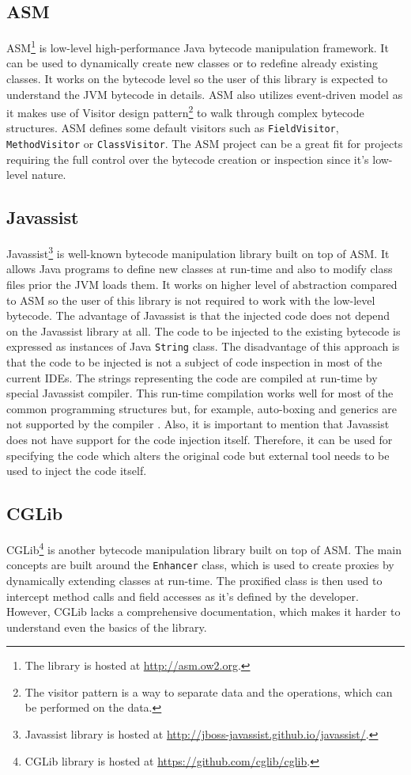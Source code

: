 \subsection{ASM}
\label{asm}
ASM\footnote{The library is hosted at \url{http://asm.ow2.org}.} is low-level high-performance Java bytecode manipulation framework. It can be used to dynamically create new classes or to redefine already existing classes. It works on the bytecode level so the user of this library is expected to understand the JVM bytecode in details. ASM also utilizes event-driven model as it makes use of Visitor design pattern\footnote{The visitor pattern is a way to separate data and the operations, which can be performed on the data.} to walk through complex bytecode structures. ASM defines some default visitors such as \texttt{FieldVisitor}, \texttt{MethodVisitor} or \texttt{ClassVisitor}. The ASM project can be a great fit for projects requiring the full control over the bytecode creation or inspection since it's low-level nature.
\subsection{Javassist}
\label{javassist}
Javassist\footnote{Javassist library is hosted at \url{http://jboss-javassist.github.io/javassist/}.} is well-known bytecode manipulation library built on top of ASM. It allows Java programs to define new classes at run-time and also to modify class files prior the JVM loads them. It works on higher level of abstraction compared to ASM so the user of this library is not required to work with the low-level bytecode. The advantage of Javassist is that the injected code does not depend on the Javassist library at all. The code to be injected to the existing bytecode is expressed as instances of Java \texttt{String} class. The disadvantage of this approach is that the code to be injected is not a subject of code inspection in most of the current IDEs. The strings representing the code are compiled at run-time by special Javassist compiler. This run-time compilation works well for most of the common programming structures but, for example, auto-boxing and generics are not supported by the compiler \cite{JAVASSIST}. Also, it is important to mention that Javassist does not have support for the code injection itself. Therefore, it can be used for specifying the code which alters the original code but external tool needs to be used to inject the code itself.
\subsection{CGLib}
\label{cglib}
CGLib\footnote{CGLib library is hosted at \url{https://github.com/cglib/cglib}.} is another bytecode manipulation library built on top of ASM. The main concepts are built around the \texttt{Enhancer} class, which is used to create proxies by dynamically extending classes at run-time. The proxified class is then used to intercept method calls and field accesses as it's defined by the developer. However, CGLib lacks a comprehensive documentation, which makes it harder to understand even the basics of the library.

